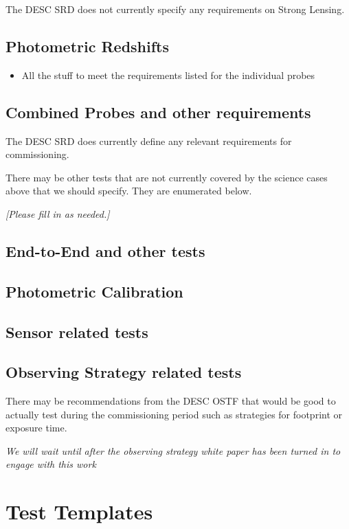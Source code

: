\documentclass[modern]{desc-tex/styles/lsstdescnote}
\begin{document}
The DESC SRD does not currently specify any requirements on Strong Lensing.

\subsection{Photometric Redshifts}
\begin{itemize}
\item All the stuff to meet the requirements listed for the individual probes
\end{itemize}

\subsection{Combined Probes and other requirements}

The DESC SRD does currently define any relevant requirements for commissioning.

\vspace{1.0in}

There may be other tests that are not currently covered by the science cases above that we should specify.  They are enumerated below.

{\it [Please fill in as needed.]}

\subsection{End-to-End and other tests}
\subsection{Photometric Calibration}
\subsection{Sensor related tests}

\subsection{Observing Strategy related tests}

There may be recommendations from the DESC OSTF that would be good to actually test during the commissioning period such as strategies for footprint or exposure time.

{\it We will wait until after the observing strategy white paper has been turned in to engage with this work}


\appendix
\section{Test Templates}
\end{document}
